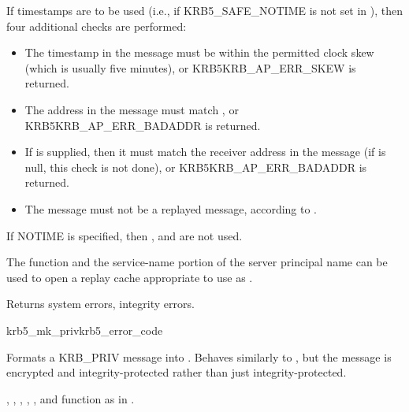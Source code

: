 If timestamps are to be used (i.e., if KRB5_SAFE_NOTIME is not set in
), then four additional checks are performed:
\begin{itemize}
\item The timestamp in the message must be within the permitted clock
	skew (which is usually five minutes), or KRB5KRB_AP_ERR_SKEW
	is returned.
\item The address in the message must match ,
	or KRB5KRB_AP_ERR_BADADDR is returned.
\item If  is supplied, then it must match
	the receiver address in the message (if 
	is null, this check is not done), or KRB5KRB_AP_ERR_BADADDR is
	returned.
\item The message must not be a replayed message, according to
	.
\end{itemize}
If NOTIME is specified, then ,
 and  are not used.


The function  and the service-name
portion of the server principal name can be used to open a
replay cache appropriate to use as .

Returns system errors, integrity errors.

\begin{funcdecl}{krb5_mk_priv}{krb5_error_code}{\funcin}
\funcinout
{}
\funcout
{}
\end{funcdecl}

Formats a KRB_PRIV message into .  Behaves similarly
to , but the message is encrypted and
integrity-protected rather than just integrity-protected.

, , ,
, ,  and
 function as in .

